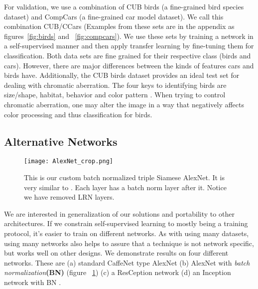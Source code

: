 \documentclass[10pt,twocolumn,letterpaper]{article}
\begin{document}
For validation, we use a combination of CUB birds \cite{Welinder10} (a fine-grained bird species dataset) and CompCars \cite{Yang15} (a fine-grained car model dataset). We call this combination CUB/CCars (Examples from these sets are in the appendix as figures~\ref{fig:birds} and ~\ref{fig:compcars}). We use these sets by training a network in a self-supervised manner and then apply transfer learning by fine-tuning them for classification. Both data sets are fine grained for their respective class (birds and cars). However, there are major differences between the kinds of features cars and birds have. Additionally, the CUB birds dataset provides an ideal test set for dealing with chromatic aberration. The four keys to identifying birds are size/shape, habitat, behavior and color pattern \cite{Cornell09}. When trying to control chromatic aberration, one may alter the image in a way that negatively affects color processing and thus classification for birds.

\subsection{Alternative Networks}

\begin{figure}
\centering
\texttt{[image: AlexNet\_crop.png]}
\caption{This is our custom batch normalized triple Siamese AlexNet. It is very similar to \cite{Doersch15}. Each layer has a batch norm layer after it. Notice we have removed LRN \cite{AlexNet} layers.}
\label{fig:alexnet}
\end{figure}
We are interested in generalization of our solutions and portability to other architectures. If we constrain self-supervised learning to mostly being a training protocol, it's easier to train on different networks. As with using many datasets, using many networks also helps to assure that a technique is not network specific, but works well on other designs. We demonstrate results on four different networks. These are (a) standard CaffeNet type AlexNet \cite{AlexNet,Caffe} (b) AlexNet with \emph{batch normalization}{\bf (BN)} \cite{BatchNorm} (figure ~\ref{fig:alexnet}) (c) a ResCeption network \cite{Mundhenk2016} (d) an Inception network with BN \cite{Inceptionv4,BatchNorm}.
\end{document}
